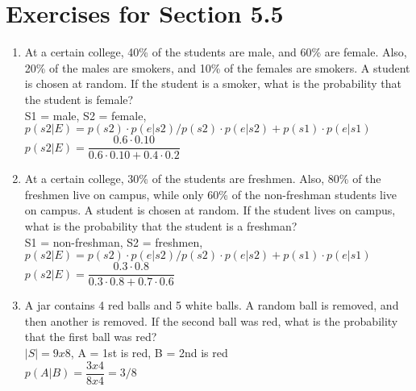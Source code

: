 \documentclass[12pt]{article}
\begin{document}
\section*{Exercises for Section 5.5}
\begin{enumerate}
    \item At a certain college, 40\% of the students are male, and 60\% are female. Also, 20\% of the males are smokers, and 10\% of the females are smokers. A student is chosen at random. If the student is a smoker, what is the probability that the student is female?\\
	S1 = male, S2 = female, $p(s2|E) = p(s2) \cdot p(e|s2)/p(s2) \cdot p(e|s2) + p(s1) \cdot p(e|s1)$\\
	$p(s2|E) = \dfrac{0.6 \cdot 0.10}{0.6 \cdot 0.10 + 0.4 \cdot 0.2}$
    \item At a certain college, 30\% of the students are freshmen. Also, 80\% of the freshmen live on campus, while only 60\% of the non-freshman students live on campus. A student is chosen at random. If the student lives on campus, what is the probability that the student is a freshman?\\
	S1 = non-freshman, S2 = freshmen, $p(s2|E) = p(s2) \cdot p(e|s2)/p(s2) \cdot p(e|s2) + p(s1) \cdot p(e|s1)$\\
	$p(s2|E) = \dfrac{0.3 \cdot 0.8}{0.3 \cdot 0.8 + 0.7 \cdot 0.6}$
    \item A jar contains 4 red balls and 5 white balls. A random ball is removed, and then another is removed. If the second ball was red, what is the probability that the first ball was red?\\
	$|S| = 9x8$, A = 1st is red, B = 2nd is red\\
	$p(A|B) = \dfrac{3x4}{8x4} = 3/8$
\end{enumerate}
\end{document}
